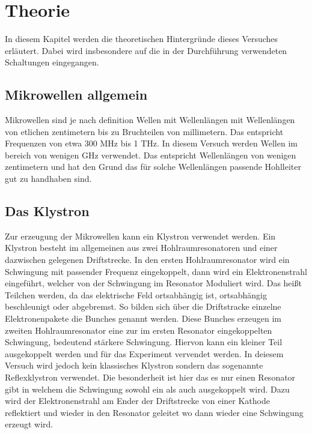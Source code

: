 \section{Theorie} 
\label{sec:Theorie}

In diesem Kapitel werden die theoretischen Hintergründe dieses Versuches erläutert. Dabei wird insbesondere auf die in der Durchführung verwendeten Schaltungen eingegangen.

\subsection{Mikrowellen allgemein}
\label{sec:thallgemein}
Mikrowellen sind je nach definition Wellen mit Wellenlängen mit Wellenlängen von etlichen zentimetern bis
zu Bruchteilen von millimetern. Das entspricht Frequenzen von etwa 300 MHz bis 1 THz. In diesem Versuch werden
Wellen im bereich von wenigen GHz verwendet. Das entspricht Wellenlängen von wenigen zentimetern und hat den
Grund das für solche Wellenlängen passende Hohlleiter gut zu handhaben sind.

\subsection{Das Klystron}
\label{sec:thklystron}
Zur erzeugung der Mikrowellen kann ein Klystron verwendet werden. Ein Klystron besteht im allgemeinen 
aus zwei Hohlraumresonatoren und einer dazwischen gelegenen Driftstrecke. In den ersten Hohlraumresonator 
wird ein Schwingung mit passender Frequenz eingekoppelt, dann wird ein Elektronenstrahl eingeführt, welcher 
von der Schwingung im Resonator Moduliert wird. Das heißt Teilchen werden, da das elektrische Feld ortsabhängig
ist, ortsabhängig beschleunigt oder abgebremst. So bilden sich über die Driftstracke 
einzelne Elektronenpakete die Bunches genannt werden. Diese Bunches erzeugen im zweiten Hohlraumresonator eine
zur im ersten Resonator eingekoppelten Schwingung, bedeutend stärkere Schwingung. Hiervon kann ein kleiner Teil 
ausgekoppelt werden und für das Experiment vervendet werden. In deiesem Versuch wird jedoch kein klassisches
Klystron sondern das sogenannte Reflexklystron verwendet. Die besonderheit ist hier das es nur einen Resonator 
gibt in welchem die Schwingung sowohl ein als auch ausgekoppelt wird. Dazu wird der Elektronenstrahl am Ender der 
Driftstrecke von einer Kathode reflektiert und wieder in den Resonator geleitet wo dann wieder eine Schwingung
erzeugt wird.

